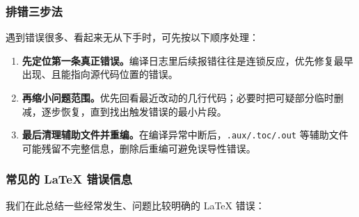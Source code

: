 \subsubsection{排错三步法}

遇到错误很多、看起来无从下手时，可先按以下顺序处理：
\begin{enumerate}
  \item \textbf{先定位第一条真正错误。}编译日志里后续报错往往是连锁反应，优先修复最早出现、且能指向源代码位置的错误。
  \item \textbf{再缩小问题范围。}优先回看最近改动的几行代码；必要时把可疑部分临时删减，逐步恢复，直到找出触发错误的最小片段。
  \item \textbf{最后清理辅助文件并重编。}在编译异常中断后，\texttt{.aux/.toc/.out} 等辅助文件可能残留不完整信息，删除后重编可避免误导性错误。
\end{enumerate}

\subsubsection{常见的 \LaTeX{} 错误信息}

我们在此总结一些经常发生、问题比较明确的 \LaTeX{} 错误：

\long{}

